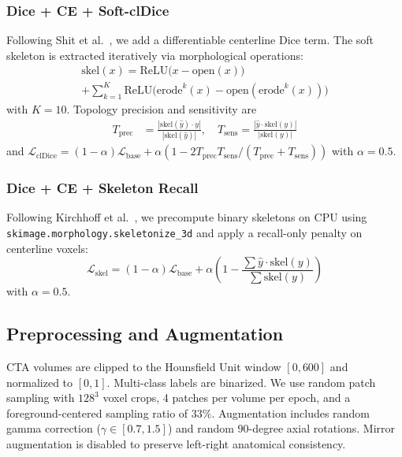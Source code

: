 \documentclass[conference]{IEEEtran}
\begin{document}
\subsubsection{Dice + CE + Soft-clDice}
Following Shit et al.~\cite{shit2021}, we add a differentiable centerline Dice term. The soft skeleton is extracted iteratively via morphological operations:
\begin{multline}
    \text{skel}(x) = \text{ReLU}\bigl(x - \text{open}(x)\bigr) \\
    + \sum_{k=1}^{K} \text{ReLU}\bigl(\text{erode}^k(x) - \text{open}(\text{erode}^k(x))\bigr)
\end{multline}
with $K=10$. Topology precision and sensitivity are
\begin{align}
    T_{\text{prec}} &= \frac{|\text{skel}(\hat{y}) \cdot y|}{|\text{skel}(\hat{y})|}, \quad
    T_{\text{sens}} = \frac{|\hat{y} \cdot \text{skel}(y)|}{|\text{skel}(y)|}
\end{align}
and $\mathcal{L}_{\text{clDice}} = (1-\alpha)\mathcal{L}_{\text{base}} + \alpha(1 - 2T_{\text{prec}}T_{\text{sens}}/(T_{\text{prec}}+T_{\text{sens}}))$ with $\alpha = 0.5$.

\subsubsection{Dice + CE + Skeleton Recall}
Following Kirchhoff et al.~\cite{kirchhoff2024}, we precompute binary skeletons on CPU using \texttt{skimage.morphology.skeletonize\_3d} and apply a recall-only penalty on centerline voxels:
\begin{equation}
    \mathcal{L}_{\text{skel}} = (1-\alpha)\mathcal{L}_{\text{base}} + \alpha\left(1 - \frac{\sum \hat{y} \cdot \text{skel}(y)}{\sum \text{skel}(y)}\right)
\end{equation}
with $\alpha = 0.5$.

\subsection{Preprocessing and Augmentation}

CTA volumes are clipped to the Hounsfield Unit window $[0, 600]$ and normalized to $[0, 1]$. Multi-class labels are binarized. We use random patch sampling with $128^3$ voxel crops, 4 patches per volume per epoch, and a foreground-centered sampling ratio of 33\%. Augmentation includes random gamma correction ($\gamma \in [0.7, 1.5]$) and random 90-degree axial rotations. Mirror augmentation is disabled to preserve left-right anatomical consistency.
\end{document}
